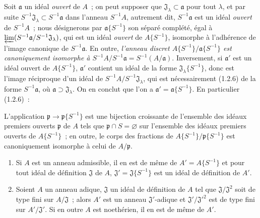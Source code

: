 \begin{env}[7.6.9]
\label{0.7.6.9-fr}
Soit $\mathfrak a$ un idéal \emph{ouvert} de $A$~; on peut supposer que
$\mathfrak J_\lambda\subset\mathfrak a$ pour tout $\lambda$, et par suite
$S^{-1}\mathfrak J_\lambda\subset S^{-1}\mathfrak a$ dans l'anneau
$S^{-1}A$, autrement dit, $S^{-1}\mathfrak a$ est un idéal \emph{ouvert} de
$S^{-1}A$~; nous désignerons par $\mathfrak a\{S^{-1}\}$ son séparé complété,
égal à $\varprojlim(S^{-1}\mathfrak a/S^{-1}\mathfrak J_\lambda)$, qui est un
idéal \emph{ouvert} de $A\{S^{-1}\}$, isomorphe à l'adhérence de l'image
canonique de $S^{-1}\mathfrak a$. En outre, \emph{l'anneau discret
$A\{S^{-1}\}/\mathfrak a\{S^{-1}\}$ est canoniquement isomorphe à
$S^{-1}A/S^{-1}\mathfrak a=S^{-1}(A/\mathfrak a)$}. Inversement, si
$\mathfrak a'$ est un idéal ouvert de $A\{S^{-1}\}$, $\mathfrak a'$ contient
un idéal de la forme $\mathfrak J_\lambda\{S^{-1}\}$, donc est l'image
réciproque d'un idéal de $S^{-1}A/S^{-1}\mathfrak J_\lambda$, qui est
nécessairement (1.2.6) de la forme $S^{-1}\mathfrak a$, où
$\mathfrak a\supset\mathfrak J_\lambda$. On en conclut que l'on a
$\mathfrak a'=\mathfrak a\{S^{-1}\}$. En particulier (1.2.6)~:
\end{env}

\begin{proposition}[7.6.10]
\label{0.7.6.10-fr}
L'application $\mathfrak p\to\mathfrak p\{S^{-1}\}$ est une bijection
croissante de l'ensemble des idéaux \textup{premiers ouverts} $\mathfrak p$ de $A$ tels
que $\mathfrak p\cap S=\varnothing$ sur l'ensemble des idéaux \textup{premiers ouverts}
de $A\{S^{-1}\}$~; en outre, le corps des fractions de
$A\{S^{-1}\}/\mathfrak p\{S^{-1}\}$ est canoniquement isomorphe à celui de
$A/\mathfrak p$.
\end{proposition}

\begin{proposition}[7.6.11]
\label{0.7.6.11-fr}
\begin{enumerate}
  \item[\rm(i)] Si $A$ est un anneau admissible, il en est de même de
    $A'=A\{S^{-1}\}$ et pour tout idéal de définition $\mathfrak J$ de $A$,
    $\mathfrak J'=\mathfrak J\{S^{-1}\}$ est un idéal de définition de $A'$.
  \item[\rm(ii)] Soient $A$ un anneau adique, $\mathfrak J$ un idéal de
    définition de $A$ tel que $\mathfrak J/\mathfrak J^2$ soit de type fini
    sur $A/\mathfrak J$~; alors $A'$ est un anneau $\mathfrak J'$-adique et
    $\mathfrak J'/\mathfrak J'^2$ est de type fini sur
    $A'/\mathfrak J'$. Si en outre $A$ est noethérien, il en est de même de
    $A'$.
\end{enumerate}
\end{proposition}

